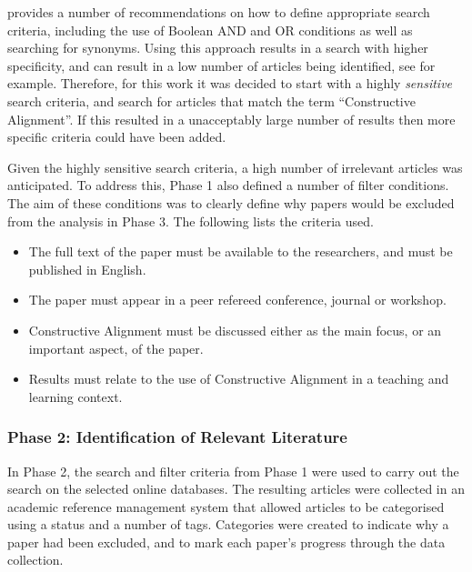 \citet{Kitchenham:2004} provides a number of recommendations on how to define appropriate search criteria, including the use of Boolean AND and OR conditions as well as searching for synonyms. Using this approach results in a search with higher specificity, and can result in a low number of articles being identified, see \citet{Salleh:2011} for example. Therefore, for this work it was decided to start with a highly \emph{sensitive} search criteria, and search for articles that match the term ``Constructive Alignment''. If this resulted in a unacceptably large number of results then more specific criteria could have been added.

Given the highly sensitive search criteria, a high number of irrelevant articles was anticipated. To address this, Phase 1 also defined a number of filter conditions. The aim of these conditions was to clearly define why papers would be excluded from the analysis in Phase 3. The following lists the criteria used.

\begin{itemize}[noitemsep,nolistsep]
	\item The full text of the paper must be available to the researchers, and must be published in English.
	\item The paper must appear in a peer refereed conference, journal or workshop.
	\item Constructive Alignment must be discussed either as the main focus, or an important aspect, of the paper.
	\item Results must relate to the use of Constructive Alignment in a teaching and learning context.
\end{itemize}


\subsubsection{Phase 2: Identification of Relevant Literature} %
\label{ssub:identification_of_relevant_literature}

In Phase 2, the search and filter criteria from Phase 1 were used to carry out the search on the selected online databases. The resulting articles were collected in an academic reference management system that allowed articles to be categorised using a status and a number of tags. Categories were created to indicate why a paper had been excluded, and to mark each paper's progress through the data collection. 

